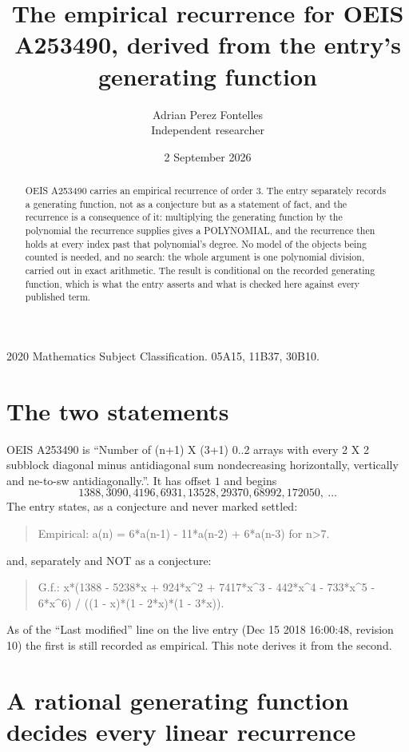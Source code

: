 \documentclass[11pt,a4paper]{article}
\title{The empirical recurrence for OEIS A253490, derived from the entry's generating function}
\author{Adrian Perez Fontelles\\ \small Independent researcher}
\date{2 September 2026}
\theoremstyle{plain}
\theoremstyle{definition}
\begin{document}
\maketitle

\begin{abstract}
OEIS A253490 carries an empirical recurrence of order $3$. The entry separately records a
generating function, not as a conjecture but as a statement of fact, and the recurrence is a
consequence of it: multiplying the generating function by the polynomial the recurrence
supplies gives a POLYNOMIAL, and the recurrence then holds at every index past that
polynomial's degree. No model of the objects being counted is needed, and no search: the
whole argument is one polynomial division, carried out in exact arithmetic. The result is
conditional on the recorded generating function, which is what the entry asserts and what is
checked here against every published term.
\end{abstract}

\noindent\small 2020 Mathematics Subject Classification. 05A15, 11B37, 30B10.\normalsize

\section{The two statements}

OEIS A253490 is ``Number of (n+1) X (3+1) 0..2 arrays with every 2 X 2 subblock diagonal minus antidiagonal sum nondecreasing horizontally, vertically and ne-to-sw antidiagonally.''. It has offset $1$ and begins
\[
1388, 3090, 4196, 6931, 13528, 29370, 68992, 172050,\ \dots
\]
The entry states, as a conjecture and never marked settled:
\begin{quote}
Empirical: a(n) = 6*a(n-1) - 11*a(n-2) + 6*a(n-3) for n>7.
\end{quote}
and, separately and NOT as a conjecture:
\begin{quote}
G.f.: x*(1388 - 5238*x + 924*x\^{}2 + 7417*x\^{}3 - 442*x\^{}4 - 733*x\^{}5 - 6*x\^{}6) / ((1 - x)*(1 - 2*x)*(1 - 3*x)).
\end{quote}
As of the ``Last modified'' line on the live entry (Dec 15 2018 16:00:48, revision 10) the first is still
recorded as empirical. This note derives it from the second.

\section{A rational generating function decides every linear recurrence}
\end{document}
